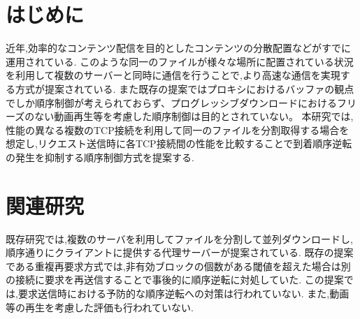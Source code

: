 \documentclass{ltjsarticle}
\begin{document}
 
\vspace{-5mm}
\section{はじめに}
\vspace{-2mm}
近年,効率的なコンテンツ配信を目的としたコンテンツの分散配置などがすでに運用されている.
このような同一のファイルが様々な場所に配置されている状況を利用して複数のサーバーと同時に通信を行うことで,より高速な通信を実現する方式が提案されている\cite{mhttp}.
また既存の提案ではプロキシにおけるバッファの観点でしか順序制御が考えられておらず、プログレッシブダウンロードにおけるフリーズのない動画再生等を考慮した順序制御は目的とされていない。
本研究では,性能の異なる複数のTCP接続を利用して同一のファイルを分割取得する場合を想定し,リクエスト送信時に各TCP接続間の性能を比較することで到着順序逆転の発生を抑制する順序制御方式を提案する.
\vspace{-7mm}

\section{関連研究}
\vspace{-2mm}
既存研究では,複数のサーバを利用してファイルを分割して並列ダウンロードし,順序通りにクライアントに提供する代理サーバーが提案されている\cite{proxy}.
既存の提案である重複再要求方式では,非有効ブロックの個数がある閾値を超えた場合は別の接続に要求を再送信することで事後的に順序逆転に対処していた.
この提案では,要求送信時における予防的な順序逆転への対策は行われていない.
また,動画等の再生を考慮した評価も行われていない.
\vspace{-7mm}
\end{document}
